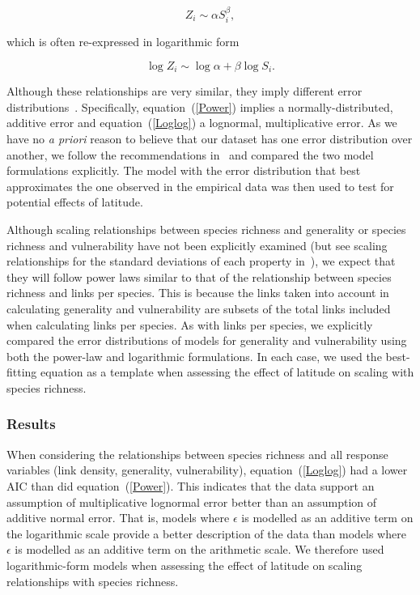 \documentclass[12pt]{article}
\begin{document}
    \begin{equation}
    \label{Power}
    Z_{i} \sim \alpha S_{i}^{\beta}  ,
    \end{equation}

    \noindent which is often re-expressed in logarithmic form 

    \begin{equation}
    \label{Loglog}
    \log{Z_{i}} \sim \log{\alpha} + \beta\log{S_{i}}  .
    \end{equation}

    \noindent Although these relationships are very similar, they imply different error distributions~\cite{Xiao2011}.
    Specifically, equation~(\ref{Power}) implies a normally-distributed, additive 
    error and equation~(\ref{Loglog}) a lognormal,
    multiplicative error. As we have no \emph{a priori} reason to believe that our dataset 
    has one error distribution over another, we follow the recommendations in~\cite{Xiao2011} and compared the two
    model formulations explicitly. The model with the error distribution that best approximates the one
    observed in the empirical
    data was then used to test for potential effects of latitude.


    Although scaling relationships between species richness and generality or
    species richness and vulnerability have not been explicitly examined (but see scaling 
    relationships for the standard deviations of each property in~\cite{Riede2010}), we expect that they will follow
    power laws similar to that of the relationship between species richness and links per species.
    This is because the links taken into account in calculating generality and vulnerability are subsets 
    of the total links included when calculating links per species. As with links per species, we explicitly 
    compared the error distributions of models for generality and vulnerability using
    both the power-law and logarithmic formulations. 
    In each case, we used the best-fitting equation as a template when assessing the effect of latitude on scaling with
    species richness. 


  \subsubsection*{Results}

    When considering the relationships between species richness and all response variables 
    (link density, generality, vulnerability), equation~(\ref{Loglog}) had a
    lower AIC than did equation~(\ref{Power}). This indicates that the
    data support an assumption of multiplicative lognormal error better than an
    assumption of additive normal error. That is, models where $\epsilon$ is
    modelled as an additive term on
    the logarithmic scale provide a better description of the data than models
    where $\epsilon$ is modelled as an additive term on the arithmetic scale.  
    We therefore used logarithmic-form models when assessing the
    effect of latitude on scaling relationships  with species richness.
\end{document}
